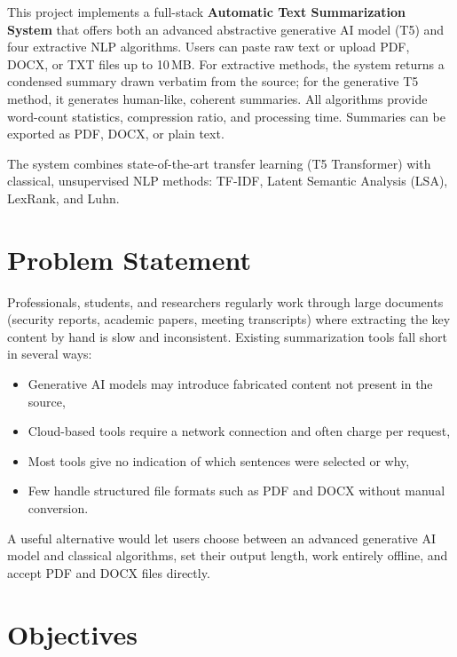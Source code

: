\documentclass[12pt,a4paper]{article}
\begin{document}
This project implements a full-stack \textbf{Automatic Text Summarization System} that offers both an advanced abstractive generative AI model (T5) and four extractive NLP algorithms. Users can paste raw text or upload PDF, DOCX, or TXT files up to 10\,MB. For extractive methods, the system returns a condensed summary drawn verbatim from the source; for the generative T5 method, it generates human-like, coherent summaries. All algorithms provide word-count statistics, compression ratio, and processing time. Summaries can be exported as PDF, DOCX, or plain text.

The system combines state-of-the-art transfer learning (T5 Transformer) with classical, unsupervised NLP methods: TF-IDF, Latent Semantic Analysis (LSA), LexRank, and Luhn.

\section{Problem Statement}

Professionals, students, and researchers regularly work through large documents (security reports, academic papers, meeting transcripts) where extracting the key content by hand is slow and inconsistent. Existing summarization tools fall short in several ways:

\begin{itemize}[noitemsep]
  \item Generative AI models may introduce fabricated content not present in the source,
  \item Cloud-based tools require a network connection and often charge per request,
  \item Most tools give no indication of which sentences were selected or why,
  \item Few handle structured file formats such as PDF and DOCX without manual conversion.
\end{itemize}

A useful alternative would let users choose between an advanced generative AI model and classical algorithms, set their output length, work entirely offline, and accept PDF and DOCX files directly.

\section{Objectives}
\end{document}
